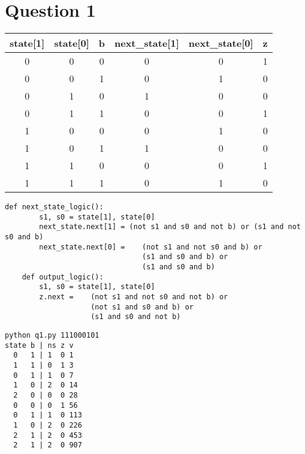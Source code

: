 \documentclass[12pt,letterpaper]{article}
\begin{document}
\section*{Question 1}

\begin{table}[H]
\begin{tabular}{|c|c|c|c|c|c|}
\hline
state{[}1{]} & state{[}0{]} & b & next\_state{[}1{]} & next\_state{[}0{]} & z \\ \hline
0            & 0            & 0 & 0                  & 0                  & 1 \\ \hline
0            & 0            & 1 & 0                  & 1                  & 0 \\ \hline
0            & 1            & 0 & 1                  & 0                  & 0 \\ \hline
0            & 1            & 1 & 0                  & 0                  & 1 \\ \hline
1            & 0            & 0 & 0                  & 1                  & 0 \\ \hline
1            & 0            & 1 & 1                  & 0                  & 0 \\ \hline
1            & 1            & 0 & 0                  & 0                  & 1 \\ \hline
1            & 1            & 1 & 0                  & 1                  & 0 \\ \hline
\end{tabular}
\end{table}

     \begin{lstlisting}[style = Python]
    def next_state_logic():
        s1, s0 = state[1], state[0]
        next_state.next[1] = (not s1 and s0 and not b) or (s1 and not s0 and b)
        next_state.next[0] =    (not s1 and not s0 and b) or  
                                (s1 and s0 and b) or 
                                (s1 and s0 and b)
    def output_logic():
        s1, s0 = state[1], state[0]
        z.next =    (not s1 and not s0 and not b) or 
                    (not s1 and s0 and b) or 
                    (s1 and s0 and not b)
    \end{lstlisting}
     \begin{lstlisting}[style = Python]
python q1.py 111000101
state b | ns z v
  0   1 | 1  0 1
  1   1 | 0  1 3
  0   1 | 1  0 7
  1   0 | 2  0 14
  2   0 | 0  0 28
  0   0 | 0  1 56
  0   1 | 1  0 113
  1   0 | 2  0 226
  2   1 | 2  0 453
  2   1 | 2  0 907
    \end{lstlisting}
\end{document}
